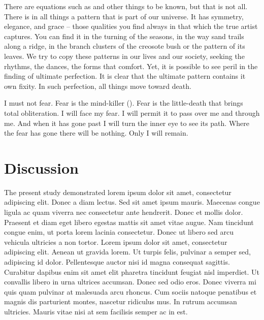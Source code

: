 There are equations such as  and other things to be known\cite{Hill78a}, but that is not all. There is in
all things a pattern that is part of our universe. It has symmetry, elegance, and grace -- those qualities you find
always in that which the true artist captures. You can find it in the turning of the seasons, in the way sand trails
along a ridge, in the branch clusters of the creosote bush or the pattern of its leaves. We try to copy these patterns
in our lives and our society, seeking the rhythms, the dances, the forms that comfort. Yet, it is possible to see peril
in the finding of ultimate perfection. It is clear that the ultimate pattern contains it own fixity. In such
perfection, all things move toward death.

 I must not fear. Fear is the mind-killer (). Fear is the little-death that brings total
obliteration. I will face my fear. I will permit it to pass over me and through me. And when it has gone past I will
turn the inner eye to see its path. Where the fear has gone there will be nothing. Only I will remain. 

\section*{Discussion}

The present study demonstrated lorem ipsum dolor sit amet, consectetur adipiscing elit. Donec a diam lectus. Sed sit
amet ipsum mauris. Maecenas congue ligula ac quam viverra nec consectetur ante hendrerit. Donec et mollis dolor.
Praesent et diam eget libero egestas mattis sit amet vitae augue. Nam tincidunt congue enim, ut porta lorem lacinia
consectetur. Donec ut libero sed arcu vehicula ultricies a non tortor. Lorem ipsum dolor sit amet, consectetur
adipiscing elit. Aenean ut gravida lorem. Ut turpis felis, pulvinar a semper sed, adipiscing id dolor. Pellentesque
auctor nisi id magna consequat sagittis. Curabitur dapibus enim sit amet elit pharetra tincidunt feugiat nisl
imperdiet. Ut convallis libero in urna ultrices accumsan. Donec sed odio eros. Donec viverra mi quis quam pulvinar at
malesuada arcu rhoncus. Cum sociis natoque penatibus et magnis dis parturient montes, nascetur ridiculus mus. In rutrum
accumsan ultricies. Mauris vitae nisi at sem facilisis semper ac in est.


